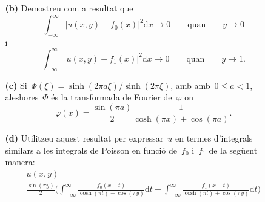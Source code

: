 \documentclass[a4paper]{article}
\theoremstyle{plain}
\theoremstyle{definition}
\providecommand{\uppi}{\pi}
\newcommand{\diff}{\mathrm{d}}
\newcommand{\abs}[1]{\lvert{#1}\rvert}
\begin{document}
\begin{enumerate}
    \item[]\begin{enumerate}
        \item[\textbf{(b)}] Demostreu com a resultat que
            \[
                \int_{-\infty}^{\infty}
                \abs{u(x,y) - f_{0}(x)}^{2}
                \diff x
                \to 0
                \qquad\text{quan}\qquad
                y\to 0
            \]
            i
            \[
                \int_{-\infty}^{\infty}
                \abs{u(x,y) - f_{1}(x)}^{2}
                \diff x
                \to 0
                \qquad\text{quan}\qquad
                y\to 1.
            \]
    \end{enumerate}
\end{enumerate}

\begin{enumerate}
    \item[]\begin{enumerate}
        \item[\textbf{(c)}] Si~\(\Phi(\xi)=\sinh(2\uppi a\xi)/\sinh(2\uppi\xi)\), amb
            amb~\(0\leq a<1\), aleshores~\(\Phi\) és la transformada de Fourier
            de~\(\varphi\) on
            \[
                \varphi(x)
                = \frac{\sin(\uppi a)}{2}
                \frac{1}{\cosh(\uppi x) + \cos(\uppi a)}.
            \]
    \end{enumerate}
\end{enumerate}

\begin{enumerate}
    \item[]\begin{enumerate}
        \item[\textbf{(d)}] Utilitzeu aquest resultat per expressar~\(u\) en
            termes d'integrals similars a les integrals de Poisson en funció
            de~\(f_{0}\) i~\(f_{1}\) de la següent manera:
            \begin{multline*}
                u(x,y)
                = \\
                \frac{\sin(\uppi y)}{2}
                \biggl(
                    \int_{-\infty}^{\infty}
                    \frac{f_{0}(x-t)}{\cosh(\uppi t)-\cos(\uppi y)}
                    \diff t
                    +
                    \int_{-\infty}^{\infty}
                    \frac{f_{1}(x-t)}{\cosh(\uppi t)+\cos(\uppi y)}
                    \diff t
                \biggr)
            \end{multline*}
    \end{enumerate}
\end{enumerate}
\end{document}
